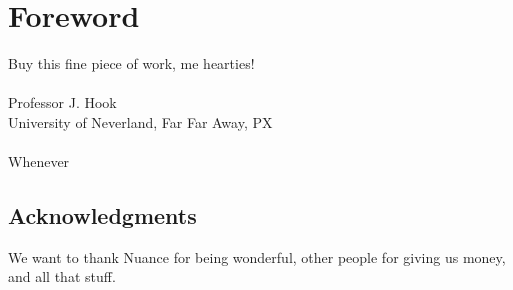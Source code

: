 
\chapter{Foreword}

Buy this fine piece of work, me hearties!
~\\
~\\
Professor J. Hook\\
University of Neverland, Far Far Away, PX\\
~\\
Whenever\\

\section*{Acknowledgments}

We want to thank Nuance for being wonderful, other people for giving
us money, and all that stuff.
